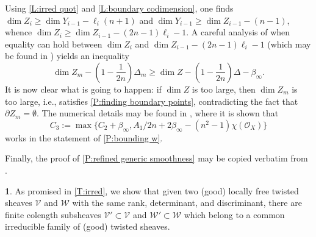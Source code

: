 \documentclass[11pt]{amsart}
\newcommand{\ms}[1]{\mathscr #1}
\renewcommand{\[}{[\!\hspace{0.03em}[}
\renewcommand{\]}{]\!\hspace{0.03em}]}
\renewcommand{\(}{(\!\hspace{0.03em}(}
\renewcommand{\)}{)\!\hspace{0.03em})}
\theoremstyle{definition}
\newtheorem{para}[lem]{\indent}
\theoremstyle{remark}
\begin{document}
Using \ref{L:irred quot} and \ref{L:boundary codimension}, one 
finds $\dim Z_{i}\geq\dim Y_{i-1}-\ell_{i}(n+1)$ and $\dim 
Y_{i-1}\geq\dim Z_{i-1}-(n-1)$, whence $\dim Z_{i}\geq \dim 
Z_{i-1}-(2n-1)\ell_{i}-1$.  A careful analysis of when equality can 
hold between $\dim Z_{i}$ and $\dim Z_{i-1}-(2n-1)\ell_{i}-1$ (which 
may be found in \cite[pp.\ 211-212]{h-l}) yields 
an inequality
$$\dim Z_{m}-\left(1-\frac{1}{2n}\right)\Delta_{m}\geq \dim 
Z-\left(1-\frac{1}{2n}\right)\Delta-\beta_{\infty}.$$
It is now clear what is going to happen: if $\dim Z$ is too large, 
then $\dim Z_{m}$ is too large, i.e., satisfies \ref{P:finding 
boundary points}, contradicting the fact that $\partial 
Z_{m}=\emptyset$.  The numerical details may be found in \cite[p.\ 
212-213]{h-l}, where it is shown that $$C_{3}:=\max\{C_{2}+\beta_{\infty}, 
A_{1}/2n +2\beta_{\infty}-(n^{2}-1)\chi({\ms O}_{X})\}$$ works in the 
statement of \ref{P:bounding w}.


Finally, the proof of \ref{P:refined generic smoothness} may be 
copied verbatim from \cite[p.\ 213]{h-l}.  

\begin{para}\label{Para:coming together}  As promised in 
\ref{T:irred}, we show that given two (good) locally free twisted sheaves 
$\ms V$ and $\ms W$ with the same rank, determinant, and discriminant, 
there are finite colength subsheaves $\ms V'\subset\ms V$ and $\ms 
W'\subset\ms W$ which belong to a common irreducible family of (good) 
twisted sheaves.
\end{para}
\end{document}
